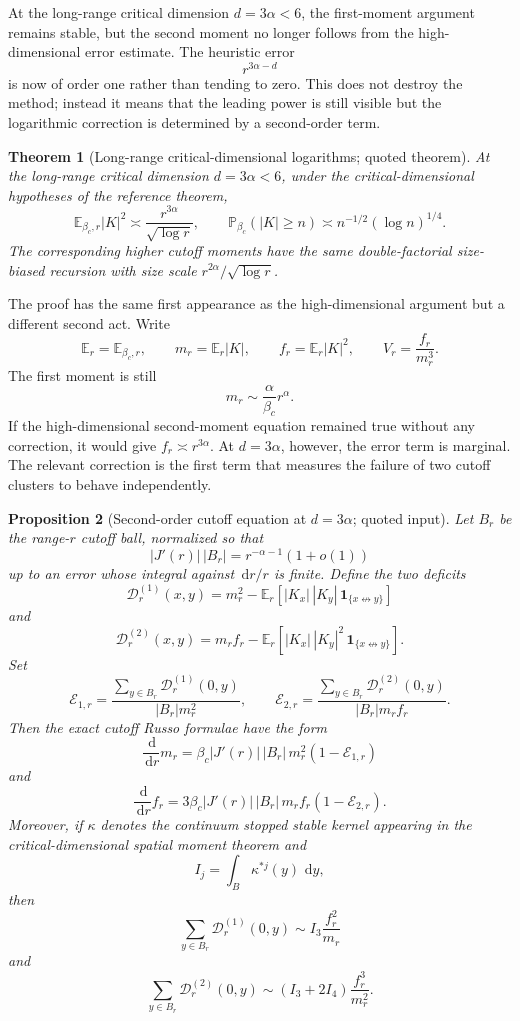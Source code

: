 \documentclass[11pt,reqno]{book}
\numberwithin{equation}{chapter}
\theoremstyle{plain}
\newtheorem{theorem}{Theorem}[chapter]
\newtheorem{prop}[theorem]{Proposition}
\theoremstyle{definition}
\theoremstyle{remark}
\newcommand{\1}{\mathbf 1}
\newcommand{\dd}{\,\mathrm d}
\begin{document}
At the long-range critical dimension $d=3\alpha<6$, the first-moment argument remains stable, but the second moment no longer follows from the high-dimensional error estimate. The heuristic error
\[
  r^{3\alpha-d}
\]
is now of order one rather than tending to zero. This does not destroy the method; instead it means that the leading power is still visible but the logarithmic correction is determined by a second-order term.

\begin{theorem}[Long-range critical-dimensional logarithms; quoted theorem]
At the long-range critical dimension \(d=3\alpha<6\), under the
critical-dimensional hypotheses of the reference theorem,
\[
  \mathbb E_{\beta_c,r}|K|^2
  \asymp
  \frac{r^{3\alpha}}{\sqrt{\log r}},
  \qquad
  \mathbb P_{\beta_c}(|K|\geq n)
  \asymp
  n^{-1/2}(\log n)^{1/4}.
\]
The corresponding higher cutoff moments have the same double-factorial
size-biased recursion with size scale \(r^{2\alpha}/\sqrt{\log r}\).
\end{theorem}

The proof has the same first appearance as the high-dimensional argument but
a different second act. Write
\[
  \mathbb E_r=\mathbb E_{\beta_c,r},\qquad
  m_r=\mathbb E_r|K|,\qquad
  f_r=\mathbb E_r|K|^2,\qquad
  V_r=\frac{f_r}{m_r^3}.
\]
The first moment is still
\[
  m_r\sim \frac{\alpha}{\beta_c}r^\alpha.
\]
If the high-dimensional second-moment equation remained true without any
correction, it would give \(f_r\asymp r^{3\alpha}\). At \(d=3\alpha\), however,
the error term is marginal. The relevant correction is the first term that
measures the failure of two cutoff clusters to behave independently.

\begin{prop}[Second-order cutoff equation at \(d=3\alpha\); quoted input]
Let \(B_r\) be the range-\(r\) cutoff ball, normalized so that
\[
  |J'(r)|\,|B_r|=r^{-\alpha-1}(1+o(1))
\]
up to an error whose integral against \(\dd r/r\) is finite. Define the two
deficits
\[
  \mathscr D_r^{(1)}(x,y)
  =
  m_r^2
  -
  \mathbb E_r\!\left[
    |K_x|\,|K_y|\,
    \1_{\{x\not\leftrightarrow y\}}
  \right]
\]
and
\[
  \mathscr D_r^{(2)}(x,y)
  =
  m_r f_r
  -
  \mathbb E_r\!\left[
    |K_x|\,|K_y|^2\,
    \1_{\{x\not\leftrightarrow y\}}
  \right].
\]
Set
\[
  \mathcal E_{1,r}
  =
  \frac{\sum_{y\in B_r}\mathscr D_r^{(1)}(0,y)}
       {|B_r|m_r^2},
  \qquad
  \mathcal E_{2,r}
  =
  \frac{\sum_{y\in B_r}\mathscr D_r^{(2)}(0,y)}
       {|B_r|m_r f_r}.
\]
Then the exact cutoff Russo formulae have the form
\[
  \frac{\dd}{\dd r}m_r
  =
  \beta_c |J'(r)|\,|B_r|\,m_r^2(1-\mathcal E_{1,r})
\]
and
\[
  \frac{\dd}{\dd r}f_r
  =
  3\beta_c |J'(r)|\,|B_r|\,m_r f_r(1-\mathcal E_{2,r}).
\]
Moreover, if \(\kappa\) denotes the continuum stopped stable kernel appearing
in the critical-dimensional spatial moment theorem and
\[
  I_j=\int_B\kappa^{*j}(y)\,\dd y,
\]
then
\[
  \sum_{y\in B_r}\mathscr D_r^{(1)}(0,y)
  \sim
  I_3\frac{f_r^2}{m_r}
\]
and
\[
  \sum_{y\in B_r}\mathscr D_r^{(2)}(0,y)
  \sim
  (I_3+2I_4)\frac{f_r^3}{m_r^2}.
\]
\end{prop}
\end{document}
